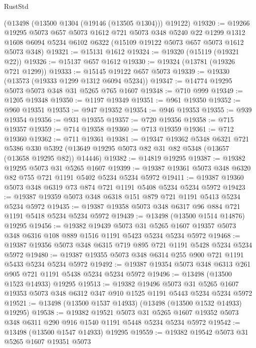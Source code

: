 \begin{lexlean}{RustStd}
\begin{coremodule}
    (@13498 (@13500 @1304 (@19146 (@13505 @1304))) @19122)
@19320 := @19266
    @19295
    @5073
    @657
    @5073
    @1612
    @721
    @5073
    @348
    @5240
    @22
    @1299
    @1312
    @1608
    @6094
    @5234
    @6102
    @6322
    (@15109 @19122 @5073 @657 @5073 @1612 @5073 @348)
@19321 := @15131 @1612
@19324 := @19320 (@15119 (@19321 @22))
@19326 := @15137 @657 @1612
@19330 := @19324 (@13781 (@19326 @721 @1299))
@19333 := @15145 @19122 @657 @5073
@19339 := @19330 (@13573 (@19333 @1299 @1312 @6094 @5234))
@19347 := @14774 @19295 @5073 @5073 @348 @31 @5265 @765 @1607
@19348 := @710 @999
@19349 := @1205 @19348
@19350 := @1197 @19349
@19351 := @961 @19350
@19352 := @960 @19351
@19353 := @947 @19352
@19354 := @946 @19353
@19355 := @939 @19354
@19356 := @931 @19355
@19357 := @720 @19356
@19358 := @715 @19357
@19359 := @714 @19358
@19360 := @713 @19359
@19361 := @712 @19360
@19362 := @711 @19361
@19381 := @19347
    @19362
    @5348
    @6321
    @721
    @5386
    @330
    @5392
    (@13649 @19295 @5073 @82 @31 @82 @5348 (@13657 (@13658 @19295 @82)) @14446)
@19382 := @14819 @19295
@19387 := @19382 @19295 @5073 @31 @5265 @1607
@19399 := @19387 @19361 @5073 @348 @6320 @82 @755 @721 @1191 @5402 @5234 @5234 @5972
@19411 := @19387 @19360 @5073 @348 @6319 @73 @874 @721 @1191 @5408 @5234 @5234 @5972
@19423 := @19387 @19359 @5073 @348 @6318 @151 @879 @721 @1191 @5413 @5234 @5234 @5972
@19435 := @19387 @19358 @5073 @348 @6317 @96 @884 @721 @1191 @5418 @5234 @5234 @5972
@19439 := @13498 (@13500 @1514 @14876) @19295
@19456 := @19382
    @19439
    @5073
    @31
    @5265
    @1607
    @19357
    @5073
    @348
    @6316
    @108
    @889
    @1516
    @1191
    @5423
    @5234
    @5234
    @5972
@19468 := @19387 @19356 @5073 @348 @6315 @719 @895 @721 @1191 @5428 @5234 @5234 @5972
@19480 := @19387 @19355 @5073 @348 @6314 @255 @900 @721 @1191 @5433 @5234 @5234 @5972
@19492 := @19387 @19354 @5073 @348 @6313 @261 @905 @721 @1191 @5438 @5234 @5234 @5972
@19496 := @13498 (@13500 @1523 @14933) @19295
@19513 := @19382
    @19496
    @5073
    @31
    @5265
    @1607
    @19353
    @5073
    @348
    @6312
    @347
    @910
    @1525
    @1191
    @5443
    @5234
    @5234
    @5972
@19521 := @13498 (@13500 @1537 @14933) (@13498 (@13500 @1532 @14933) @19295)
@19538 := @19382
    @19521
    @5073
    @31
    @5265
    @1607
    @19352
    @5073
    @348
    @6311
    @290
    @916
    @1540
    @1191
    @5448
    @5234
    @5234
    @5972
@19542 := @13498 (@13500 @1547 @14933) @19295
@19559 := @19382
    @19542
    @5073
    @31
    @5265
    @1607
    @19351
    @5073

\end{coremodule}
\end{lexlean}
